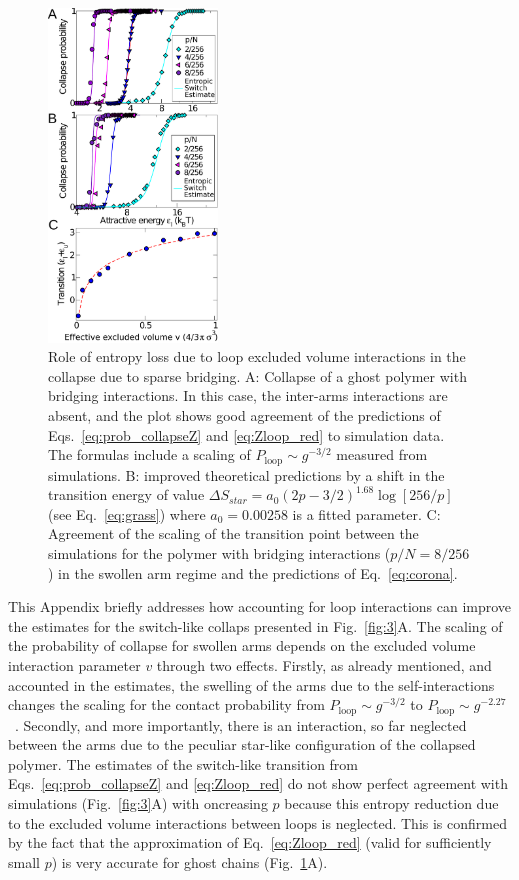 \documentclass[
preprint,
a4paper,
12pt,
superscriptaddress,
pre]{revtex4}
\begin{document}
\begin{figure}
  \centering
  \includegraphics[width=0.4\textwidth]{fig6}
  \caption{Role of entropy loss due to loop excluded volume
    interactions in the collapse due to sparse bridging. A: Collapse
    of a ghost polymer with bridging interactions. In this case, the
    inter-arms interactions are absent, and the plot shows good
    agreement of the predictions of Eqs.~\ref{eq:prob_collapseZ} and
    \ref{eq:Zloop_red} to simulation data. The formulas include a
    scaling of $P_\mathrm{loop} \sim g^{-3/2}$ measured from
    simulations. B: improved theoretical predictions by a shift in the
    transition energy of value $\Delta S_{star} = a_0 (2p -
    3/2)^{1.68} \log[256/p]$ (see Eq.~\ref{eq:grass}) where $ a_0 =
    0.00258$ is a fitted parameter. C: Agreement of the scaling of the
    transition point between the simulations for the polymer with
    bridging interactions ($p/N = 8/256$) in the swollen arm regime
    and the predictions of Eq.~\ref{eq:corona}.}
  \label{fig:6}
\end{figure}

This Appendix briefly addresses how accounting for loop interactions
can improve the estimates for the switch-like collaps presented in
Fig.~\ref{fig:3}A.  The scaling of the probability of collapse for
swollen arms depends on the excluded volume interaction parameter $v$
through two effects.  Firstly, as already mentioned, and accounted in
the estimates, the swelling of the arms due to the self-interactions
changes the scaling for the contact probability from $P_\mathrm{loop}
\sim g^{-3/2}$ to $P_\mathrm{loop} \sim
g^{-2.27}$~\cite{Marenduzzo2006c}.  Secondly, and more importantly,
there is an interaction, so far neglected between the arms due to the
peculiar star-like configuration of the collapsed polymer.
The estimates of the switch-like transition from
Eqs.~\ref{eq:prob_collapseZ} and \ref{eq:Zloop_red} do not show
perfect agreement with simulations (Fig.~\ref{fig:3}A) with oncreasing
$p$ because this entropy reduction due to the excluded volume
interactions between loops is neglected. This is confirmed by the fact
that the approximation of Eq.~\ref{eq:Zloop_red} (valid for
sufficiently small $p$) is very accurate for ghost chains
(Fig.~\ref{fig:6}A).
\end{document}
